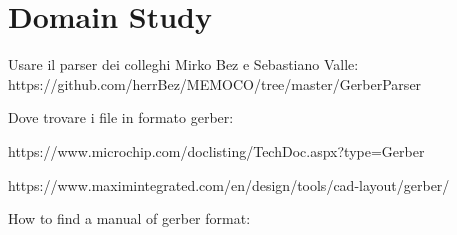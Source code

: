\section{Domain Study}

	Usare il parser dei colleghi Mirko Bez e Sebastiano Valle:
	https://github.com/herrBez/MEMOCO/tree/master/GerberParser
	
	
	Dove trovare i file in formato gerber:
	
	https://www.microchip.com/doclisting/TechDoc.aspx?type=Gerber
	
	https://www.maximintegrated.com/en/design/tools/cad-layout/gerber/
	
	How to find a manual of gerber format:
	
